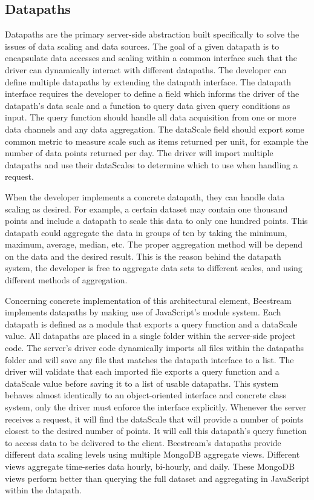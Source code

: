 \subsection{Datapaths}
Datapaths are the primary server-side abstraction built specifically to solve the issues of data scaling and data sources.  The goal of a given datapath is to encapsulate data accesses and scaling within a common interface such that the driver can dynamically interact with different datapaths.  The developer can define multiple datapaths by extending the datapath interface.  The datapath interface requires the developer to define a field which informs the driver of the datapath’s data scale and a function to query data given query conditions as input.  The query function should handle all data acquisition from one or more data channels and any data aggregation.  The dataScale field should export some common metric to measure scale such as items returned per unit, for example the number of data points returned per day.  The driver will import multiple datapaths and use their dataScales to determine which to use when handling a request. \par
When the developer implements a concrete datapath, they can handle data scaling as desired.  For example, a certain dataset may contain one thousand points and include a datapath to scale this data to only one hundred points.  This datapath could aggregate the data in groups of ten by taking the minimum, maximum, average, median, etc.  The proper aggregation method will be depend on the data and the desired result.  This is the reason behind the datapath system, the developer is free to aggregate data sets to different scales, and using different methods of aggregation. \par
Concerning concrete implementation of this architectural element, Beestream implements datapaths by making use of JavaScript’s module system.  Each datapath is defined as a module that exports a query function and a dataScale value.  All datapaths are placed in a single folder within the server-side project code.  The server’s driver code dynamically imports all files within the datapaths folder and will save any file that matches the datapath interface to a list.  The driver will validate that each imported file exports a query function and a dataScale value before saving it to a list of usable datapaths.  This system behaves almost identically to an object-oriented interface and concrete class system, only the driver must enforce the interface explicitly.  Whenever the server receives a request, it will find the dataScale that will provide a number of points closest to the desired number of points.  It will call this datapath’s query function to access data to be delivered to the client.  Beestream’s datapaths provide different data scaling levels using multiple MongoDB aggregate views.  Different views aggregate time-series data hourly, bi-hourly, and daily.  These MongoDB views perform better than querying the full dataset and aggregating in JavaScript within the datapath. \par

